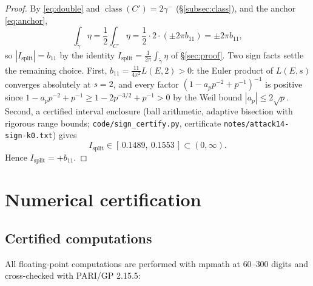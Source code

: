 \documentclass[11pt]{amsart}
\theoremstyle{definition}
\theoremstyle{remark}
\DeclareMathOperator{\class}{class}
\begin{document}
\begin{proof}
By \eqref{eq:double} and $\class(C')=2\gamma^-$
(\S\ref{subsec:class}), and the anchor \eqref{eq:anchor},
\[
  \int_{\tilde\gamma}\eta=\frac12\int_{C'}\eta
  =\frac12\cdot 2\cdot(\pm 2\pi b_{11})=\pm 2\pi b_{11},
\]
so $|I_{\mathrm{split}}|=b_{11}$ by the identity
$I_{\mathrm{split}}=\frac{1}{2\pi}\int_{\tilde\gamma}\eta$ of
\S\ref{sec:proof}. Two sign facts settle the remaining choice. First,
$b_{11}=\frac{11}{4\pi^2}L(E,2)>0$: the Euler product of $L(E,s)$
converges absolutely at $s=2$, and every factor
$(1-a_p p^{-2}+p^{-1})^{-1}$ is positive since
$1-a_p p^{-2}+p^{-1}\ge 1-2p^{-3/2}+p^{-1}>0$ by the Weil bound
$|a_p|\le2\sqrt p$. Second, a certified interval enclosure
(ball arithmetic, adaptive bisection with rigorous range bounds;
\texttt{code/sign\_certify.py}, certificate \texttt{notes/attack14-sign-k0.txt})
gives
\[
  I_{\mathrm{split}}\in[\,0.1489,\ 0.1553\,]\subset(0,\infty).
\]
Hence $I_{\mathrm{split}}=+b_{11}$. \qedhere
\end{proof}


\section{Numerical certification}
\label{sec:cert}

\subsection{Certified computations}

All floating-point computations are performed with mpmath at $60$--$300$
digits and cross-checked with PARI/GP 2.15.5:
\end{document}
